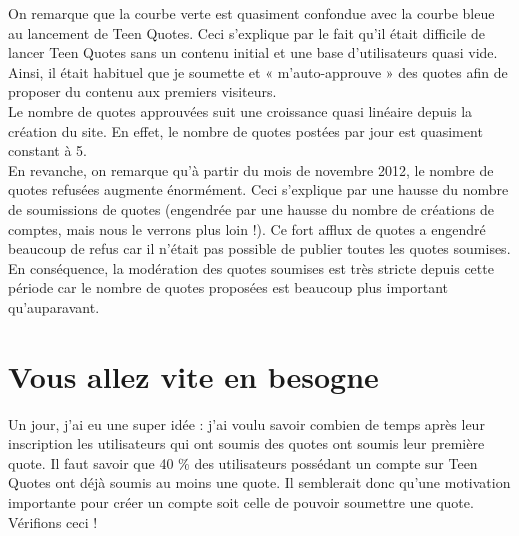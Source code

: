 \documentclass{report}
\begin{document}
	On remarque que la courbe verte est quasiment confondue avec la courbe bleue au lancement de Teen Quotes. Ceci s'explique par le fait qu'il était difficile de lancer Teen Quotes sans un contenu initial et une base d'utilisateurs quasi vide. Ainsi, il était habituel que je soumette et « m'auto-approuve » des quotes afin de proposer du contenu aux premiers visiteurs.\\

	Le nombre de quotes approuvées suit une croissance quasi linéaire depuis la création du site. En effet, le nombre de quotes postées par jour est quasiment constant à 5.\\

	En revanche, on remarque qu'à partir du mois de novembre 2012, le nombre de quotes refusées augmente énormément. Ceci s'explique par une hausse du nombre de soumissions de quotes (engendrée par une hausse du nombre de créations de comptes, mais nous le verrons plus loin !). Ce fort afflux de quotes a engendré beaucoup de refus car il n'était pas possible de publier toutes les quotes soumises. En conséquence, la modération des quotes soumises est très stricte depuis cette période car le nombre de quotes proposées est beaucoup plus important qu'auparavant.

	\section{Vous allez vite en besogne}
	Un jour, j'ai eu une super idée : j'ai voulu savoir combien de temps après leur inscription les utilisateurs qui ont soumis des quotes ont soumis leur première quote. Il faut savoir que 40 \% des utilisateurs possédant un compte sur Teen Quotes ont déjà soumis au moins une quote. Il semblerait donc qu'une motivation importante pour créer un compte soit celle de pouvoir soumettre une quote. Vérifions ceci !
\end{document}
